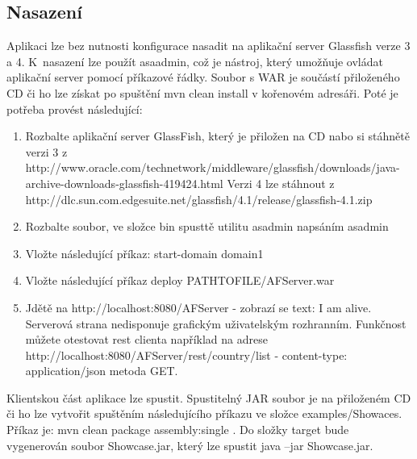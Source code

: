 \subsection{Nasazení}
Aplikaci lze bez nutnosti konfigurace nasadit na aplikační server Glassfish verze 3 a 4. K~nasazení lze použít asaadmin, což je nástroj, který umožňuje ovládat aplikační server pomocí příkazové řádky. Soubor s WAR je součástí přiloženého CD či ho lze získat po spuštění mvn clean install v kořenovém adresáři. Poté je potřeba provést následující:
\begin{enumerate}
\item Rozbalte aplikační server GlassFish, který je přiložen na CD nabo si stáhnětě verzi 3 z http://www.oracle.com/technetwork/middleware/glassfish/downloads/java-archive-downloads-glassfish-419424.html Verzi 4 lze stáhnout z \\http://dlc.sun.com.edgesuite.net/glassfish/4.1/release/glassfish-4.1.zip
\item Rozbalte soubor, ve složce bin spusttě utilitu asadmin napsáním asadmin
\item Vložte následující příkaz: start-domain domain1
\item Vložte následující příkaz deploy PATHTOFILE/AFServer.war
\item Jdětě na http://localhost:8080/AFServer - zobrazí se text: I am alive. Serverová strana nedisponuje grafickým uživatelským rozhranním. Funkčnost můžete otestovat rest clienta například na adrese http://localhost:8080/AFServer/rest/country/list - content-type: application/json metoda GET.
\end{enumerate}
Klientskou část aplikace lze spustit. Spustitelný JAR soubor je na přiloženém CD či ho lze vytvořit spuštěním následujícího příkazu ve složce examples/Showaces. Příkaz je: mvn clean package assembly:single . Do složky target bude vygenerován soubor Showcase.jar, který lze spustit java –jar Showcase.jar. 
